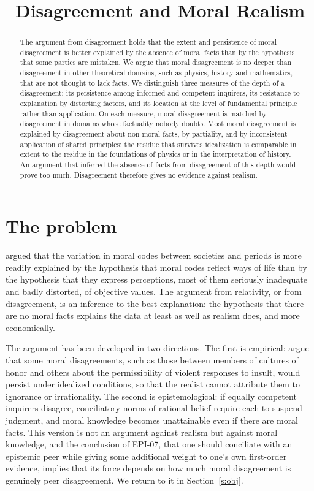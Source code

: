 \documentclass{situationist-preprint}
\title{Disagreement and Moral Realism}
\begin{document}
\maketitle

\begin{abstract}
The argument from disagreement holds that the extent and persistence of moral disagreement is better explained by the absence of moral facts than by the hypothesis that some parties are mistaken. We argue that moral disagreement is no deeper than disagreement in other theoretical domains, such as physics, history and mathematics, that are not thought to lack facts. We distinguish three measures of the depth of a disagreement: its persistence among informed and competent inquirers, its resistance to explanation by distorting factors, and its location at the level of fundamental principle rather than application. On each measure, moral disagreement is matched by disagreement in domains whose factuality nobody doubts. Most moral disagreement is explained by disagreement about non-moral facts, by partiality, and by inconsistent application of shared principles; the residue that survives idealization is comparable in extent to the residue in the foundations of physics or in the interpretation of history. An argument that inferred the absence of facts from disagreement of this depth would prove too much. Disagreement therefore gives no evidence against realism.
\end{abstract}

\section{The problem}

\citet[ch.~1, \S 8]{Mackie1977} argued that the variation in moral codes between societies and periods is more readily explained by the hypothesis that moral codes reflect ways of life than by the hypothesis that they express perceptions, most of them seriously inadequate and badly distorted, of objective values. The argument from relativity, or from disagreement, is an inference to the best explanation: the hypothesis that there are no moral facts explains the data at least as well as realism does, and more economically.

The argument has been developed in two directions. The first is empirical: \citet{DorisPlakias2008} argue that some moral disagreements, such as those between members of cultures of honor and others about the permissibility of violent responses to insult, would persist under idealized conditions, so that the realist cannot attribute them to ignorance or irrationality. The second is epistemological: if equally competent inquirers disagree, conciliatory norms of rational belief require each to suspend judgment, and moral knowledge becomes unattainable even if there are moral facts. This version is not an argument against realism but against moral knowledge, and the conclusion of EPI-07, that one should conciliate with an epistemic peer while giving some additional weight to one's own first-order evidence, implies that its force depends on how much moral disagreement is genuinely peer disagreement. We return to it in Section~\ref{s:obj}.
\end{document}
